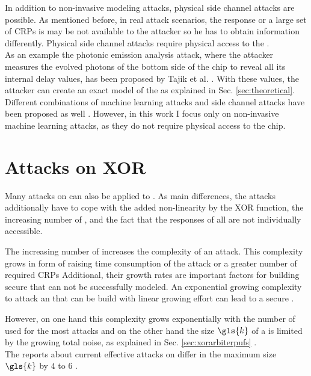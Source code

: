 In addition to non-invasive modeling attacks, physical side channel attacks are possible.
As mentioned before, in real attack scenarios, the \puf response or a large set of \acp{CRP} is may be not available to the attacker so he has to obtain information differently.
Physical side channel attacks require physical access to the \puf.\\
As an example the photonic emission analysis attack, where the attacker measures the evolved photons of the bottom side of the \apuf chip to reveal all its internal delay values, has been proposed by Tajik et al. \cite{Tajik2014PhysicalPUFs}.
With these values, the attacker can create an exact model of the \apuf as explained in Sec. \ref{sec:theoretical}.\\
Different combinations of machine learning attacks and side channel attacks have been proposed as well \cite{Mahmoud2013CombinedPUFs, Xu2014Hybrid}.
However, in this work I focus only on non-invasive machine learning attacks, as they do not require physical access to the \apuf chip.


\section{Attacks on \acs{XOR} \apufs}
\label{sec:attacksonxorarbiter}

Many attacks on \apufs can also be applied to \xpufs.
As main differences, the attacks additionally have to cope with the added non-linearity by the \ac{XOR} function, the increasing number of \apufs, and the fact that the responses of all \apufs are not individually accessible.

The increasing number of \apufs increases the complexity of an attack.
This complexity grows in form of raising time consumption of the attack or a greater number of required \acp{CRP}
Additional, their growth rates are important factors for building secure \xpufs that can not be successfully modeled.
An exponential growing complexity to attack an \xpuf that can be build with linear growing effort can lead to a secure \puf.

However, on one hand this complexity grows exponentially with the number of used \apufs for the most attacks and on the other hand the size $\gls{k}$ of a \xpuf is limited by the growing total noise, as explained in Sec. \ref{sec:xorarbiterpufs} \cite{Ruhrmair2010ModelingFunctions}.\\
The reports about current effective attacks on \xpufs differ in the maximum size $\gls{k}$ by $4$ to $6$ \cite{Ganji2015WhyPUFs, Xu2014Hybrid}.

